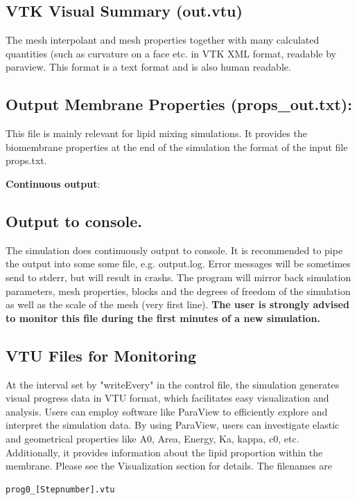 \documentclass[11pt]{article}
\begin{document}
\subsection{VTK Visual Summary (out.vtu)}
The mesh interpolant and mesh properties together with many calculated quantities (such as curvature on a face etc. in VTK XML format, readable by paraview. This format is a text format and is also human readable.


\subsection{Output Membrane Properties (props\_out.txt):}
This file is mainly relevant for lipid mixing simulations. It provides the biomembrane properties at the end of the simulation the format of the input file props.txt.

\textbf{Continuous output}:

\subsection{Output to console.}
The simulation does continuously output to console. It is recommended to pipe the output into some some file, e.g. output.log.
Error messages will be sometimes send to stderr, but will result in crashs.
The program will mirror back simulation parameters, mesh properties, blocks and the degrees of freedom of the simulation as well as the scale of the mesh (very first line). 
\textbf{The user is strongly advised to monitor this file during the first minutes of a new simulation.}

\subsection{VTU Files for Monitoring} 
At the interval set by "writeEvery" in the control file, the simulation generates visual progress data in VTU format, which facilitates easy visualization and analysis. Users can employ software like ParaView to efficiently explore and interpret the simulation data. By using ParaView, users can investigate elastic and geometrical properties like A0, Area, Energy, Ka, kappa, c0, etc. Additionally, it provides information about the lipid proportion within the membrane. Please see the Visualization section for details. The filenames are

\begin{mdframed}[backgroundcolor=lightgray, linecolor=lightgray] 
\begin{verbatim}
prog0_[Stepnumber].vtu
\end{verbatim}
\end{mdframed}
\end{document}
